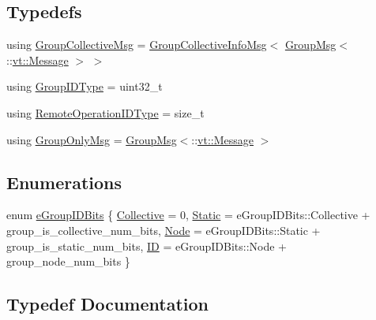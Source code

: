 \subsection*{Typedefs}
\begin{DoxyCompactItemize}
\item 
using \hyperlink{namespacevt_1_1group_a4c1183efe0185992fefb3ab38a55a8a7}{Group\+Collective\+Msg} = \hyperlink{structvt_1_1group_1_1_group_collective_info_msg}{Group\+Collective\+Info\+Msg}$<$ \hyperlink{structvt_1_1group_1_1_group_msg}{Group\+Msg}$<$\+::\hyperlink{namespacevt_a3a3ddfef40b4c90915fa43cdd5f129ea}{vt\+::\+Message} $>$ $>$
\item 
using \hyperlink{namespacevt_1_1group_a805a6643787ae841525c371fd0cefeb3}{Group\+I\+D\+Type} = uint32\+\_\+t
\item 
using \hyperlink{namespacevt_1_1group_a73f2624ddeb535b39a08b6524f26b244}{Remote\+Operation\+I\+D\+Type} = size\+\_\+t
\item 
using \hyperlink{namespacevt_1_1group_a864fcf6bc821eacf8350bf4ad15e51b3}{Group\+Only\+Msg} = \hyperlink{structvt_1_1group_1_1_group_msg}{Group\+Msg}$<$\+::\hyperlink{namespacevt_a3a3ddfef40b4c90915fa43cdd5f129ea}{vt\+::\+Message} $>$
\end{DoxyCompactItemize}
\subsection*{Enumerations}
\begin{DoxyCompactItemize}
\item 
enum \hyperlink{namespacevt_1_1group_a5a472f320821bf638e6df82757b71163}{e\+Group\+I\+D\+Bits} \{ \hyperlink{namespacevt_1_1group_a5a472f320821bf638e6df82757b71163a2481b27ee837a6fc7709550eef0a5602}{Collective} = 0, 
\hyperlink{namespacevt_1_1group_a5a472f320821bf638e6df82757b71163a67197d5832dbcbeb0d003fc3d92596ac}{Static} = e\+Group\+I\+D\+Bits\+:\+:Collective + group\+\_\+is\+\_\+collective\+\_\+num\+\_\+bits, 
\hyperlink{namespacevt_1_1group_a5a472f320821bf638e6df82757b71163a8a4c96811eeee2e4ecf9520f29210cd2}{Node} = e\+Group\+I\+D\+Bits\+:\+:Static + group\+\_\+is\+\_\+static\+\_\+num\+\_\+bits, 
\hyperlink{namespacevt_1_1group_a5a472f320821bf638e6df82757b71163a68ffa7e9fa8eaee4a810f08df0525f68}{ID} = e\+Group\+I\+D\+Bits\+:\+:Node + group\+\_\+node\+\_\+num\+\_\+bits
 \}
\end{DoxyCompactItemize}


\subsection{Typedef Documentation}
\mbox{\label{namespacevt_1_1group_a4c1183efe0185992fefb3ab38a55a8a7}} 
